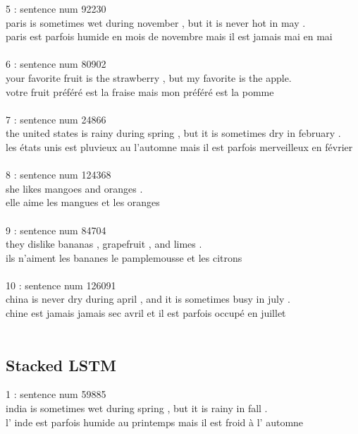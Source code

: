 \documentclass[12pt,oneside,geqno]{article}
\begin{document}
	5 : sentence num 92230\\
	paris is sometimes wet during november , but it is never hot in may .\\
	paris est parfois humide en mois de novembre mais il est jamais mai en mai \\\\
	
	6 : sentence num 80902\\
	your favorite fruit is the strawberry , but my favorite is the apple.\\
	votre fruit préféré est la fraise mais mon préféré est la pomme \\\\
	
	7 : sentence num 24866\\
	the united states is rainy during spring , but it is sometimes dry in february .\\
	les états unis est pluvieux au l'automne mais il est parfois merveilleux en février \\\\
	
	8 : sentence num 124368\\
	she likes mangoes and oranges .\\
	elle aime les mangues et les oranges \\\\
	
	9 : sentence num 84704\\
	they dislike bananas , grapefruit , and limes .\\
	ils n'aiment les bananes le pamplemousse et les citrons\\\\
	
	10 : sentence num 126091\\
	china is never dry during april , and it is sometimes busy in july .\\
	chine est jamais jamais sec avril et il est parfois occupé en juillet \\\\
	
	\subsection{Stacked LSTM}
	1 : sentence num 59885\\
	india is sometimes wet during spring , but it is rainy in fall .\\
	l' inde est parfois humide au printemps mais il est froid à l' automne \\\\
	
\end{document}
